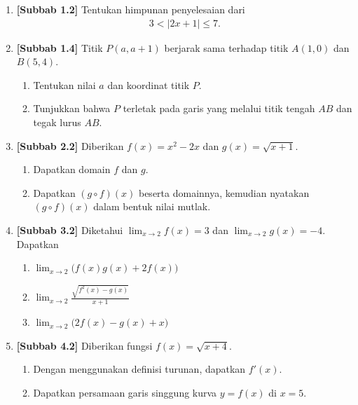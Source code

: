 \documentclass[10pt,openany,a4paper]{article}
\theoremstyle{definition}
\theoremstyle{definition}
\theoremstyle{plain}
\begin{document}
\newpage

\begin{enumerate}
    \item \textbf{[Subbab 1.2]} Tentukan himpunan penyelesaian dari
    \begin{align*}
        3<|2x+1|\leq 7.
    \end{align*}

    \item \textbf{[Subbab 1.4]} Titik $P(a,a+1)$ berjarak sama terhadap titik $A(1,0)$ dan $B(5,4)$.
    \begin{enumerate}
        \item Tentukan nilai $a$ dan koordinat titik $P$.
        \item Tunjukkan bahwa $P$ terletak pada garis yang melalui titik tengah $AB$ dan tegak lurus $AB$.
    \end{enumerate}

    \item \textbf{[Subbab 2.2]} Diberikan $f(x)=x^2-2x$ dan $g(x)=\sqrt{x+1}$.
    \begin{enumerate}
        \item Dapatkan domain $f$ dan $g$.
        \item Dapatkan $(g\circ f)(x)$ beserta domainnya, kemudian nyatakan $(g\circ f)(x)$ dalam bentuk nilai mutlak.
    \end{enumerate}

    \item \textbf{[Subbab 3.2]} Diketahui $\displaystyle\lim_{x\to 2}f(x)=3$ dan $\displaystyle\lim_{x\to 2}g(x)=-4$. Dapatkan
    \begin{enumerate}
        \item $\displaystyle\lim_{x\to 2}\big(f(x)g(x)+2f(x)\big)$
        \item $\displaystyle\lim_{x\to 2}\frac{\sqrt{f^2(x)-g(x)}}{x+1}$
        \item $\displaystyle\lim_{x\to 2}\big(2f(x)-g(x)+x\big)$
    \end{enumerate}

    \item \textbf{[Subbab 4.2]} Diberikan fungsi $f(x)=\sqrt{x+4}$.
    \begin{enumerate}
        \item Dengan menggunakan definisi turunan, dapatkan $f'(x)$.
        \item Dapatkan persamaan garis singgung kurva $y=f(x)$ di $x=5$.
    \end{enumerate}
\end{enumerate}
\end{document}
